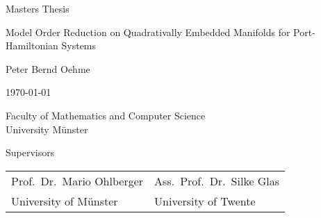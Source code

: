 \documentclass{article}
\begin{document}
    \begin{titlepage}
        \setlength{\parindent}{0pt}

        \begin{center}
            \vspace*{12em}

            Masters Thesis

            \vspace*{3em}

            {\Huge{Model Order Reduction on Quadrativally Embedded Manifolds for Port-Hamiltonian Systems}\par}

            \vspace*{6em}

            {\Large{Peter Bernd Oehme}}

            \vspace*{\fill}

            \today

            \vspace*{3em}

            Faculty of Mathematics and Computer Science \\
            University Münster

            \vspace*{3em}

            

            \vspace*{3em}

            Supervisors

            \begin{tabularx}{\textwidth}{YY}
                Prof.\ Dr.\ Mario Ohlberger & Ass.\ Prof.\ Dr.\ Silke Glas \\
                University of Münster & University of Twente
            \end{tabularx}
        \end{center}
    \end{titlepage}
\end{document}
